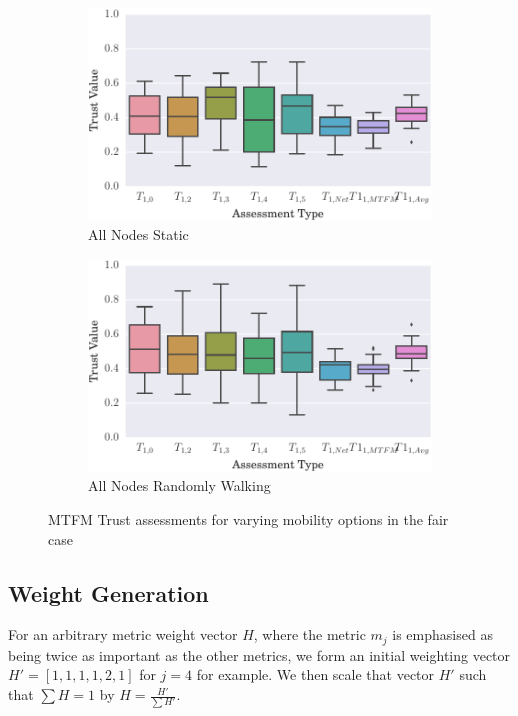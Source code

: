 \documentclass[runningheads,a4paper]{llncs}
\begin{document}
\begin{figure}
\begin{subfigure}{.5\textwidth}
  \centering
  \includegraphics[width=.95\linewidth]{img/trust_bella_static.pdf}
  \caption{All Nodes Static}
  \label{fig:trust_static}
\end{subfigure}%
\begin{subfigure}{.5\textwidth}
\centering
  \includegraphics[width=.95\linewidth]{img/trust_bella_all_mobile.pdf}
  \caption{All Nodes Randomly Walking}
  \label{fig:trust_all_mobile}
\end{subfigure}
\caption{MTFM Trust assessments for varying mobility options in the fair case}
\label{fig:trust_mobility}
\end{figure}

\subsection{Weight Generation}

For an arbitrary metric weight vector $H$, where the metric $m_j$ is emphasised as being twice as important as the other metrics, we form an initial weighting vector $H' = [1,1,1,1,2,1]$ for $j=4$ for example. We then scale that vector $H'$ such that $\sum H = 1$ by $H= \frac{H'}{\sum H'}$.
\end{document}
